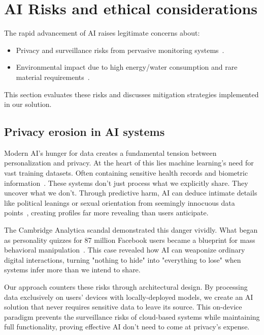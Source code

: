 \documentclass[licencjacka,en]{pracamgr}
\begin{document}
\section{AI Risks and ethical considerations}

The rapid advancement of AI raises legitimate concerns about:
\begin{itemize}
    \item Privacy and surveillance risks from pervasive monitoring systems~\cite{not_sroka_vid, ai_scare2, ai_scare3}.
    \item Environmental impact due to high energy/water consumption and rare material requirements~\cite{ai_env_concerns}.
\end{itemize}

This section evaluates these risks and discusses mitigation strategies implemented in our solution.

\subsection{Privacy erosion in AI systems}
Modern AI's hunger for data creates a fundamental tension between personalization and privacy. At the heart of this lies machine learning's need for vast training datasets. Often containing sensitive health records and biometric information~\cite{ibm_vast_data, data_guard}. These systems don't just process what we explicitly share. They uncover what we don't. Through predictive harm, AI can deduce intimate details like political leanings or sexual orientation from seemingly innocuous data points~\cite{transcend}, creating profiles far more revealing than users anticipate.

The Cambridge Analytica scandal demonstrated this danger vividly. What began as personality quizzes for 87 million Facebook users became a blueprint for mass behavioral manipulation~\cite{transcend}. This case revealed how AI can weaponize ordinary digital interactions, turning "nothing to hide" into "everything to lose" when systems infer more than we intend to share.

Our approach counters these risks through architectural design. By processing data exclusively on users' devices with locally-deployed models, we create an AI solution that never requires sensitive data to leave its source. This on-device paradigm prevents the surveillance risks of cloud-based systems while maintaining full functionality, proving effective AI don't need to come at privacy's expense.
\end{document}
